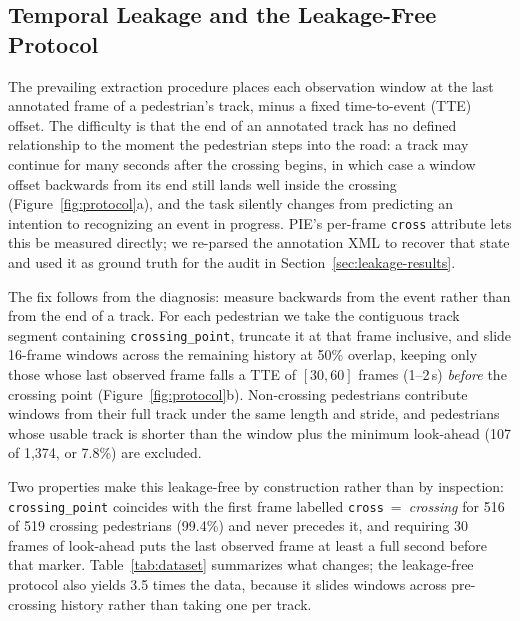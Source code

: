 \documentclass[mti,article,submit,moreauthors]{Definitions/mdpi}
\begin{document}
\subsection{Temporal Leakage and the Leakage-Free Protocol}
\label{sec:leakage}

The prevailing extraction procedure places each observation window at the last annotated frame of a pedestrian's track, minus a fixed time-to-event (TTE) offset. The difficulty is that the end of an annotated track has no defined relationship to the moment the pedestrian steps into the road: a track may continue for many seconds after the crossing begins, in which case a window offset backwards from its end still lands well inside the crossing (Figure~\ref{fig:protocol}a), and the task silently changes from predicting an intention to recognizing an event in progress. PIE's per-frame \texttt{cross} attribute lets this be measured directly; we re-parsed the annotation XML to recover that state and used it as ground truth for the audit in Section~\ref{sec:leakage-results}.

The fix follows from the diagnosis: measure backwards from the event rather than from the end of a track. For each pedestrian we take the contiguous track segment containing \texttt{crossing\_point}, truncate it at that frame inclusive, and slide 16-frame windows across the remaining history at 50\% overlap, keeping only those whose last observed frame falls a TTE of $[30, 60]$ frames (1--2\,s) \emph{before} the crossing point (Figure~\ref{fig:protocol}b). Non-crossing pedestrians contribute windows from their full track under the same length and stride, and pedestrians whose usable track is shorter than the window plus the minimum look-ahead (107 of 1,374, or 7.8\%) are excluded.

Two properties make this leakage-free by construction rather than by inspection: \texttt{crossing\_point} coincides with the first frame labelled \texttt{cross}~=~\emph{crossing} for 516 of 519 crossing pedestrians (99.4\%) and never precedes it, and requiring 30 frames of look-ahead puts the last observed frame at least a full second before that marker. Table~\ref{tab:dataset} summarizes what changes; the leakage-free protocol also yields 3.5 times the data, because it slides windows across pre-crossing history rather than taking one per track.
\end{document}
